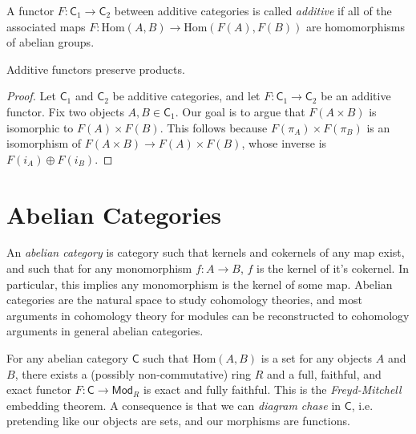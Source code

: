 A functor $F: \mathsf{C}_1 \to \mathsf{C}_2$ between additive categories is called \emph{additive} if all of the associated maps $F: \text{Hom}(A,B) \to \text{Hom}(F(A),F(B))$ are homomorphisms of abelian groups.

\begin{theorem}
    Additive functors preserve products.
\end{theorem}
\begin{proof}
    Let $\mathsf{C}_1$ and $\mathsf{C}_2$ be additive categories, and let $F: \mathsf{C}_1 \to \mathsf{C}_2$ be an additive functor. Fix two objects $A,B \in \mathsf{C}_1$. Our goal is to argue that $F(A \times B)$ is isomorphic to $F(A) \times F(B)$. This follows because $F(\pi_A) \times F(\pi_B)$ is an isomorphism of $F(A \times B) \to F(A) \times F(B)$, whose inverse is $F(i_A) \oplus F(i_B)$.
\end{proof}

\section{Abelian Categories}

An \emph{abelian category} is category such that kernels and cokernels of any map exist, and such that for any monomorphism $f: A \to B$, $f$ is the kernel of it's cokernel. In particular, this implies any monomorphism is the kernel of some map. Abelian categories are the natural space to study cohomology theories, and most arguments in cohomology theory for modules can be reconstructed to cohomology arguments in general abelian categories.

For any abelian category $\mathsf{C}$ such that $\text{Hom}(A,B)$ is a set for any objects $A$ and $B$, there exists a (possibly non-commutative) ring $R$ and a full, faithful, and exact functor $F: \mathsf{C} \to \mathsf{Mod}_R$ is exact and fully faithful. This is the \emph{Freyd-Mitchell} embedding theorem. A consequence is that we can \emph{diagram chase} in $\mathsf{C}$, i.e. pretending like our objects are sets, and our morphisms are functions.

